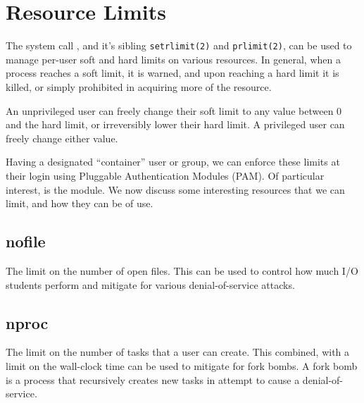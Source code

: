 
\section{Resource Limits}

The system call \cite{man-2-getrlimit}, and it's sibling \texttt{setrlimit(2)}
and \texttt{prlimit(2)}, can be used to manage per-user soft and hard limits on
various resources. In general, when a process reaches a soft limit, it is
warned, and upon reaching a hard limit it is killed, or simply prohibited in
acquiring more of the resource.

An unprivileged user can freely change their soft limit to any value between 0
and the hard limit, or irreversibly lower their hard limit. A privileged user
can freely change either value.

Having a designated ``container'' user or group, we can enforce these limits at
their login using Pluggable Authentication Modules (PAM). Of particular
interest, is the \cite{pam-limits} module. We now discuss some interesting
resources that we can limit, and how they can be of use.

\subsection{nofile}

The limit on the number of open files. This can be used to control how much I/O
students perform and mitigate for various denial-of-service attacks.

\subsection{nproc}

The limit on the number of tasks that a user can create. This combined, with a
limit on the wall-clock time can be used to mitigate for fork bombs. A fork
bomb is a process that recursively creates new tasks in attempt to cause a
denial-of-service.
